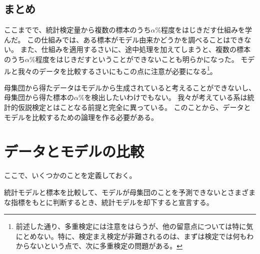 \subsection{まとめ}
ここまでで、統計検定量から複数の標本のうち$\alpha\%$程度をはじきだす仕組みを学んだ。
この仕組みでは、ある標本がモデル由来かどうかを調べることはできない。
また、仕組みを適用するさいに、途中処理を加えてしまうと、複数の標本のうち$\alpha\%$程度をはじきだすということができないことも明らかになった。
モデルと我々のデータを比較するさいにもこの点に注意が必要になる\footnote{前述した通り、多重検定には注意をはらうが、他の留意点については特に気にとめない。特に、検定まえ検定が非難されるのは、まずは検定では何もわからないという点で、次に多重検定の問題がある。}。

母集団から得たデータはモデルから生成されていると考えることができないし、母集団から得た標本の$\alpha\%$を検出したいわけでもない。
我々が考えている系は統計的仮説検定とはことなる前提と完全に異っている。
このことから、データとモデルを比較するための論理を作る必要がある。




\section{データとモデルの比較}
ここで、いくつかのことを定義しておく。
\begin{defi}
    統計モデルと標本を比較して、モデルが母集団のことを予測できないとさまざまな指標をもとに判断するとき、統計モデルを却下すると宣言する。
\end{defi}

